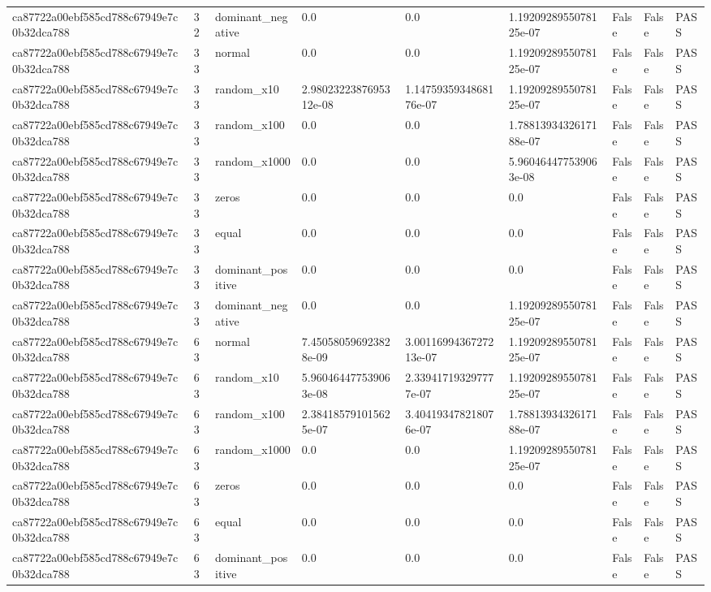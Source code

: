\begin{tabular}{lllllllll}
ca87722a00ebf585cd788c67949e7c0b32dca788 & 32 & dominant\_negative & 0.0 & 0.0 & 1.1920928955078125e-07 & False & False & PASS \\
ca87722a00ebf585cd788c67949e7c0b32dca788 & 33 & normal & 0.0 & 0.0 & 1.1920928955078125e-07 & False & False & PASS \\
ca87722a00ebf585cd788c67949e7c0b32dca788 & 33 & random\_x10 & 2.9802322387695312e-08 & 1.1475935934868176e-07 & 1.1920928955078125e-07 & False & False & PASS \\
ca87722a00ebf585cd788c67949e7c0b32dca788 & 33 & random\_x100 & 0.0 & 0.0 & 1.7881393432617188e-07 & False & False & PASS \\
ca87722a00ebf585cd788c67949e7c0b32dca788 & 33 & random\_x1000 & 0.0 & 0.0 & 5.960464477539063e-08 & False & False & PASS \\
ca87722a00ebf585cd788c67949e7c0b32dca788 & 33 & zeros & 0.0 & 0.0 & 0.0 & False & False & PASS \\
ca87722a00ebf585cd788c67949e7c0b32dca788 & 33 & equal & 0.0 & 0.0 & 0.0 & False & False & PASS \\
ca87722a00ebf585cd788c67949e7c0b32dca788 & 33 & dominant\_positive & 0.0 & 0.0 & 0.0 & False & False & PASS \\
ca87722a00ebf585cd788c67949e7c0b32dca788 & 33 & dominant\_negative & 0.0 & 0.0 & 1.1920928955078125e-07 & False & False & PASS \\
ca87722a00ebf585cd788c67949e7c0b32dca788 & 63 & normal & 7.450580596923828e-09 & 3.0011699436727213e-07 & 1.1920928955078125e-07 & False & False & PASS \\
ca87722a00ebf585cd788c67949e7c0b32dca788 & 63 & random\_x10 & 5.960464477539063e-08 & 2.339417193297777e-07 & 1.1920928955078125e-07 & False & False & PASS \\
ca87722a00ebf585cd788c67949e7c0b32dca788 & 63 & random\_x100 & 2.384185791015625e-07 & 3.404193478218076e-07 & 1.7881393432617188e-07 & False & False & PASS \\
ca87722a00ebf585cd788c67949e7c0b32dca788 & 63 & random\_x1000 & 0.0 & 0.0 & 1.1920928955078125e-07 & False & False & PASS \\
ca87722a00ebf585cd788c67949e7c0b32dca788 & 63 & zeros & 0.0 & 0.0 & 0.0 & False & False & PASS \\
ca87722a00ebf585cd788c67949e7c0b32dca788 & 63 & equal & 0.0 & 0.0 & 0.0 & False & False & PASS \\
ca87722a00ebf585cd788c67949e7c0b32dca788 & 63 & dominant\_positive & 0.0 & 0.0 & 0.0 & False & False & PASS \\

\end{tabular}
